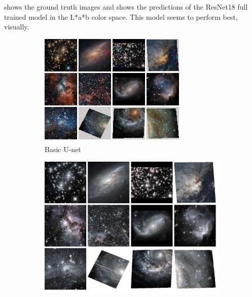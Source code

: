 \documentclass[10pt,twocolumn,letterpaper]{article}
\begin{document}
     shows the ground truth images and  shows the predictions of the ResNet18 full trained model in the L*a*b color space. This model seems to perform best, visually. 
    \begin{figure}[!htb]
    	\centering
    	\begin{subfigure}[t]{0.3\textwidth}
    		\centering
    		\includegraphics[width=\textwidth]{figures/samples_pix2pix}
    		\caption{Basic U-net}
    		\label{fig: u-net_samples}
    	\end{subfigure}
    	\begin{subfigure}[t]{0.3\textwidth}
    		\centering
    		\includegraphics[width=\textwidth]{figures/samples_pre-trained}

\end{subfigure}
\end{figure}
\end{document}
